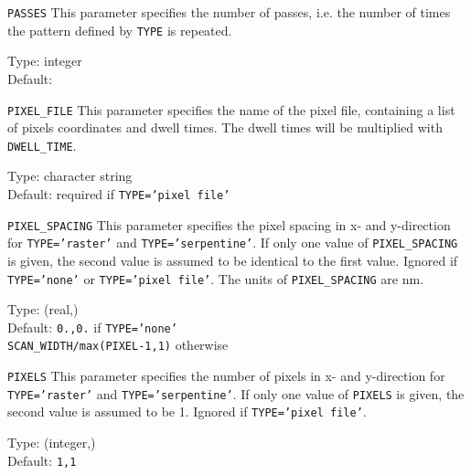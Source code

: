 \begin{keydescription}{\texttt{PASSES}}
This parameter specifies the number of passes, i.e. the number of times the
pattern defined by \texttt{TYPE} is repeated.
\begin{keytab}
   Type:    \> integer \\
   Default: 
\end{keytab}
\end{keydescription}

\begin{keydescription}{\texttt{PIXEL\_FILE}}
This parameter specifies the name of the pixel file, containing a list of
pixels coordinates and dwell times. The dwell times will be multiplied with
\texttt{DWELL\_TIME}.
\begin{keytab}
   Type:    \> character string \\
   Default: \> required if \texttt{TYPE='pixel file'}
\end{keytab}
\end{keydescription}

\begin{keydescription}{\texttt{PIXEL\_SPACING}}
This parameter specifies the pixel spacing in x- and y-direction for
\texttt{TYPE='raster'} and \texttt{TYPE='serpentine'}. If only one value of
\texttt{PIXEL\_SPACING} is given, the second value is assumed to be identical to
the first value. Ignored if \texttt{TYPE='none'} or \texttt{TYPE='pixel file'}.
The units of \texttt{PIXEL\_SPACING} are nm.
\begin{keytab}
   Type:    \> (real,) \\
   Default: \> \texttt{0.,0.} if \texttt{TYPE='none'} \\
            \> \texttt{SCAN\_WIDTH/max(PIXEL-1,1)} otherwise
\end{keytab}
\end{keydescription}

\begin{keydescription}{\texttt{PIXELS}}
This parameter specifies the number of pixels in x- and y-direction for
\texttt{TYPE='raster'} and \texttt{TYPE='serpentine'}. If only one value
of \texttt{PIXELS} is given, the second value is assumed to be 1. Ignored if
\texttt{TYPE='pixel file'}.
\begin{keytab}
   Type:    \> (integer,) \\
   Default: \> \texttt{1,1} 
\end{keytab}
\end{keydescription}

